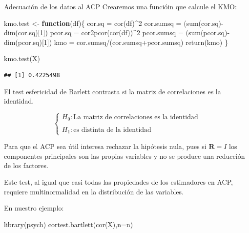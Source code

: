 \documentclass[
  ignorenonframetext,
]{beamer}
\newenvironment{Shaded}{\begin{snugshade}}{\end{snugshade}}
\newcommand{\AttributeTok}[1]{\textcolor[rgb]{0.77,0.63,0.00}{#1}}
\newcommand{\ControlFlowTok}[1]{\textcolor[rgb]{0.13,0.29,0.53}{\textbf{#1}}}
\newcommand{\DecValTok}[1]{\textcolor[rgb]{0.00,0.00,0.81}{#1}}
\newcommand{\FunctionTok}[1]{\textcolor[rgb]{0.00,0.00,0.00}{#1}}
\newcommand{\NormalTok}[1]{#1}
\newcommand{\OtherTok}[1]{\textcolor[rgb]{0.56,0.35,0.01}{#1}}
\newcommand{\SpecialCharTok}[1]{\textcolor[rgb]{0.00,0.00,0.00}{#1}}
\begin{document}
\begin{frame}[fragile]{Adecuación de los datos al ACP}
\protect\hypertarget{adecuaciuxf3n-de-los-datos-al-acp-3}{}
Crearemos una funcióin que calcule el KMO:

\begin{Shaded}
\begin{Highlighting}[]
\NormalTok{kmo.test }\OtherTok{\textless{}{-}} \ControlFlowTok{function}\NormalTok{(df)\{}
\NormalTok{cor.sq }\OtherTok{=} \FunctionTok{cor}\NormalTok{(df)}\SpecialCharTok{\^{}}\DecValTok{2}
\NormalTok{cor.sumsq }\OtherTok{=}\NormalTok{ (}\FunctionTok{sum}\NormalTok{(cor.sq)}\SpecialCharTok{{-}}\FunctionTok{dim}\NormalTok{(cor.sq)[}\DecValTok{1}\NormalTok{])}
\NormalTok{pcor.sq }\OtherTok{=} \FunctionTok{cor2pcor}\NormalTok{(}\FunctionTok{cor}\NormalTok{(df))}\SpecialCharTok{\^{}}\DecValTok{2}
\NormalTok{pcor.sumsq }\OtherTok{=}\NormalTok{ (}\FunctionTok{sum}\NormalTok{(pcor.sq)}\SpecialCharTok{{-}}\FunctionTok{dim}\NormalTok{(pcor.sq)[}\DecValTok{1}\NormalTok{])}
\NormalTok{kmo }\OtherTok{=}\NormalTok{ cor.sumsq}\SpecialCharTok{/}\NormalTok{(cor.sumsq}\SpecialCharTok{+}\NormalTok{pcor.sumsq)}
\FunctionTok{return}\NormalTok{(kmo)}
\NormalTok{\} }

\FunctionTok{kmo.test}\NormalTok{(X)}
\end{Highlighting}
\end{Shaded}

\begin{verbatim}
## [1] 0.4225498
\end{verbatim}

El test esfericidad de Barlett contrasta si la matriz de correlaciones
es la identidad.

\[\left\{ \begin{array}{l}
H_0: \mbox{La matriz de correlaciones es la identidad}\\\\ H_1: \mbox{es
distinta de la
identidad}\end{array}\right.\]

Para que el ACP sea útil interesa rechazar la hipótesis nula, pues si
\(\mathbf{R}=I\) los componentes principales son las propias variables y
no se produce una reducción de los factores.

Este test, al igual que casi todas las propiedades de los estimadores en
ACP, requiere multinormalidad en la distribución de las variables.

En nuestro ejemplo:

\begin{Shaded}
\begin{Highlighting}[]
\FunctionTok{library}\NormalTok{(psych)}
\FunctionTok{cortest.bartlett}\NormalTok{(}\FunctionTok{cor}\NormalTok{(X),}\AttributeTok{n=}\NormalTok{n)}
\end{Highlighting}
\end{Shaded}


\end{frame}
\end{document}
